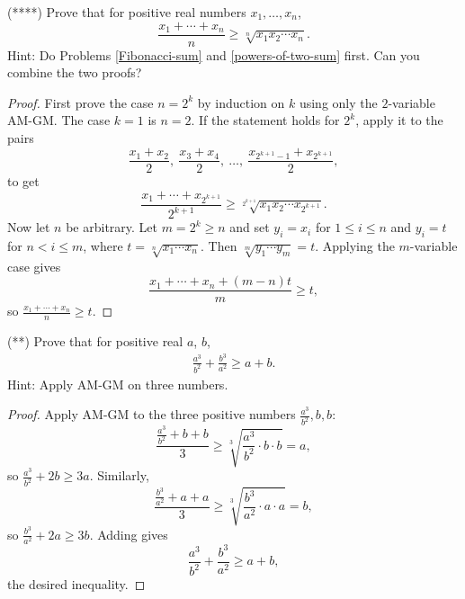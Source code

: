 \documentclass[12pt]{article}
\begin{document}
\begin{problem}
(****) Prove that for positive real numbers $x_1,\dots,x_n$,
\[
\frac{x_1+\cdots+x_n}{n}\ge \sqrt[n]{x_1x_2\cdots x_n}.
\]
Hint: Do Problems \ref{Fibonacci-sum} and \ref{powers-of-two-sum} first. Can you combine the two proofs?
\begin{proof}
First prove the case $n=2^k$ by induction on $k$ using only the $2$-variable AM-GM. The case $k=1$ is $n=2$. If the statement holds for $2^k$, apply it to the pairs
\[
\frac{x_1+x_2}{2},\ \frac{x_3+x_4}{2},\ \dots,\ \frac{x_{2^{k+1}-1}+x_{2^{k+1}}}{2},
\]
to get
\[
\frac{x_1+\cdots+x_{2^{k+1}}}{2^{k+1}}\ge \sqrt[2^{k+1}]{x_1x_2\cdots x_{2^{k+1}}}.
\]
Now let $n$ be arbitrary. Let $m=2^k\ge n$ and set $y_i=x_i$ for $1\le i\le n$ and $y_i=t$ for $n<i\le m$, where $t=\sqrt[n]{x_1\cdots x_n}$. Then $\sqrt[m]{y_1\cdots y_m}=t$. Applying the $m$-variable case gives
\[
\frac{x_1+\cdots+x_n+(m-n)t}{m}\ge t,
\]
so $\frac{x_1+\cdots+x_n}{n}\ge t$.
\end{proof}
\end{problem}

\begin{problem}
(**) Prove that for positive real $a$, $b$,
\begin{align*}
    \frac{a^3}{b^2} + \frac{b^3}{a^2} \geq a + b.
\end{align*}
Hint: Apply AM-GM on three numbers.
\begin{proof}
Apply AM-GM to the three positive numbers $\frac{a^3}{b^2}, b, b$:
\[
\frac{\frac{a^3}{b^2}+b+b}{3}\ge \sqrt[3]{\frac{a^3}{b^2}\cdot b\cdot b}=a,
\]
so $\frac{a^3}{b^2}+2b\ge 3a$. Similarly,
\[
\frac{\frac{b^3}{a^2}+a+a}{3}\ge \sqrt[3]{\frac{b^3}{a^2}\cdot a\cdot a}=b,
\]
so $\frac{b^3}{a^2}+2a\ge 3b$. Adding gives
\[
\frac{a^3}{b^2}+\frac{b^3}{a^2}\ge a+b,
\]
the desired inequality.
\end{proof}
\end{problem}
\end{document}
